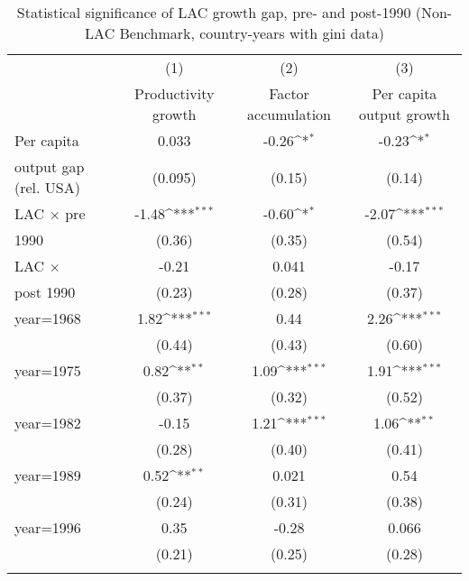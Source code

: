 \begin{table}[htbp]\centering
\def\sym#1{\ifmmode^{#1}\else\(^{#1}\)\fi}
\caption{Statistical significance of LAC growth gap, pre- and post-1990 (Non-LAC Benchmark, country-years with gini data)}
\begin{tabular}{l*{3}{c}}
\toprule
                &\multicolumn{1}{c}{(1)}&\multicolumn{1}{c}{(2)}&\multicolumn{1}{c}{(3)}\\
                &\multicolumn{1}{c}{Productivity growth}&\multicolumn{1}{c}{Factor accumulation}&\multicolumn{1}{c}{Per capita output growth}\\
\midrule
Per capita      &    0.033         &    -0.26\sym{*}  &    -0.23\sym{*}  \\
output gap (rel. USA)&  (0.095)         &   (0.15)         &   (0.14)         \\
\addlinespace
LAC $\times$ pre&    -1.48\sym{***}&    -0.60\sym{*}  &    -2.07\sym{***}\\
1990            &   (0.36)         &   (0.35)         &   (0.54)         \\
\addlinespace
LAC $\times$    &    -0.21         &    0.041         &    -0.17         \\
post 1990       &   (0.23)         &   (0.28)         &   (0.37)         \\
\addlinespace
year=1968       &     1.82\sym{***}&     0.44         &     2.26\sym{***}\\
                &   (0.44)         &   (0.43)         &   (0.60)         \\
\addlinespace
year=1975       &     0.82\sym{**} &     1.09\sym{***}&     1.91\sym{***}\\
                &   (0.37)         &   (0.32)         &   (0.52)         \\
\addlinespace
year=1982       &    -0.15         &     1.21\sym{***}&     1.06\sym{**} \\
                &   (0.28)         &   (0.40)         &   (0.41)         \\
\addlinespace
year=1989       &     0.52\sym{**} &    0.021         &     0.54         \\
                &   (0.24)         &   (0.31)         &   (0.38)         \\
\addlinespace
year=1996       &     0.35         &    -0.28         &    0.066         \\
                &   (0.21)         &   (0.25)         &   (0.28)         \\
\addlinespace

\end{tabular}
\end{table}

